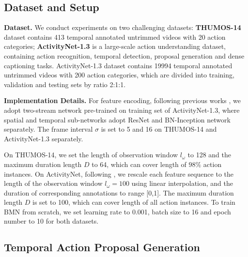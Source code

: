 \documentclass[10pt,twocolumn,letterpaper]{article}
\begin{document}
\subsection{Dataset and Setup }

\noindent
\textbf{Dataset.}
We conduct experiments on two challenging datasets: {\bf THUMOS-14} \cite{jiang2014thumos} dataset contains 413 temporal annotated untrimmed videos with 20 action categories;  {\bf ActivityNet-1.3} \cite{caba2015activitynet}  is a large-scale action understanding dataset, containing action recognition, temporal detection, proposal generation and dense captioning tasks. ActivityNet-1.3 dataset contains 19994 temporal annotated untrimmed videos with 200 action categories, which are divided into training, validation and testing sets by ratio 2:1:1.

\noindent
{\bf Implementation Details.}
%
For feature encoding, following previous works \cite{lin2018bsn,gao2017turn}, we adopt two-stream network \cite{xiong2016cuhk} pre-trained on training set of ActivityNet-1.3, where spatial and temporal sub-networks adopt ResNet and BN-Inception network separately.
%
The frame interval $\sigma $ is set  to 5 and 16 on THUMOS-14 and ActivityNet-1.3 separately.

On THUMOS-14, we set the length of observation window $l_\omega$ to 128 and the maximum duration length $D$ to 64, which can cover length of $98\%$ action instances.
%
On ActivityNet, following \cite{lin2018bsn,lin2017temporal}, we rescale each feature sequence to the length of the observation window $l_\omega = 100$ using linear interpolation, and the duration of corresponding annotations to range [0,1]. The maximum duration length $D$ is set to 100, which can cover length of all action instances.
%
%
To train BMN from scratch, we set learning rate to 0.001, batch size to 16 and epoch number to 10 for both datasets.



\subsection{Temporal Action Proposal Generation}
\end{document}
